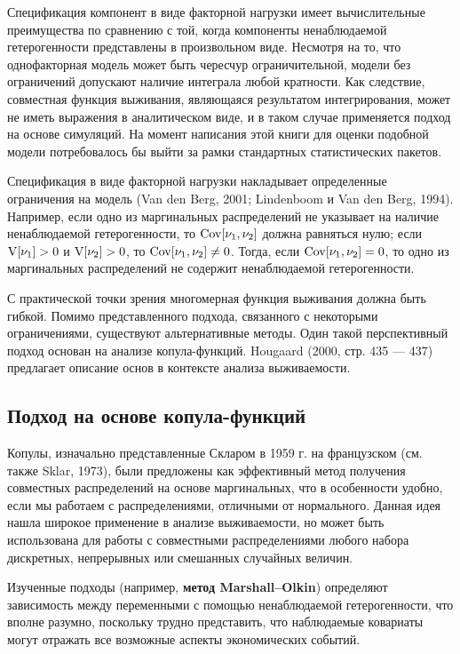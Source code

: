 Спецификация компонент в виде факторной нагрузки имеет вычислительные преимущества по сравнению с той, когда компоненты ненаблюдаемой гетерогенности представлены в произвольном виде. Несмотря на то, что однофакторная модель может быть чересчур ограничительной, модели без ограничений допускают наличие интеграла любой кратности. Как следствие, совместная функция выживания, являющаяся результатом интегрирования, может не иметь выражения в аналитическом виде, и в  таком случае применяется подход на основе симуляций. На момент написания этой книги для оценки подобной модели потребовалось бы выйти за рамки стандартных статистических пакетов.

Спецификация в виде факторной нагрузки накладывает определенные ограничения на модель (Van den Berg, 2001; Lindenboom и Van den Berg, 1994). Например, если одно из маргинальных распределений не указывает на наличие ненаблюдаемой гетерогенности, то $\mathrm{Cov}[\nu_1, \nu_2]$ должна равняться нулю; если $\mathrm{V}[\nu_1] > 0$ и $\mathrm{V}[\nu_2] > 0$, то $\mathrm{Cov}[\nu_1, \nu_2] \ne 0$. Тогда, если $\mathrm{Cov}[\nu_1, \nu_2] = 0$, то одно из маргинальных распределений не содержит ненаблюдаемой гетерогенности.

С практической точки зрения многомерная функция выживания должна быть гибкой. Помимо представленного подхода, связанного с некоторыми ограничениями, существуют альтернативные методы. Один такой перспективный подход основан на анализе копула-функций. Hougaard (2000, стр. 435 --- 437) предлагает описание основ в контексте анализа выживаемости.


\subsection{Подход на основе копула-функций}\label{sec:19.3.3}

\noindent
Копулы, изначально представленные Скларом в 1959 г. на французском (см. также Sklar, 1973), были предложены как эффективный метод получения совместных распределений на основе маргинальных, что в особенности удобно, если мы работаем с распределениями, отличными от нормального. Данная идея нашла широкое применение в анализе выживаемости, но может быть использована для работы с совместными распределениями любого набора дискретных, непрерывных или смешанных случайных величин.

Изученные подходы (например, \textbf{метод Marshall--Olkin}) определяют зависимость между переменными с помощью ненаблюдаемой гетерогенности, что вполне разумно, поскольку трудно представить, что наблюдаемые ковариаты могут отражать все возможные аспекты экономических событий.


